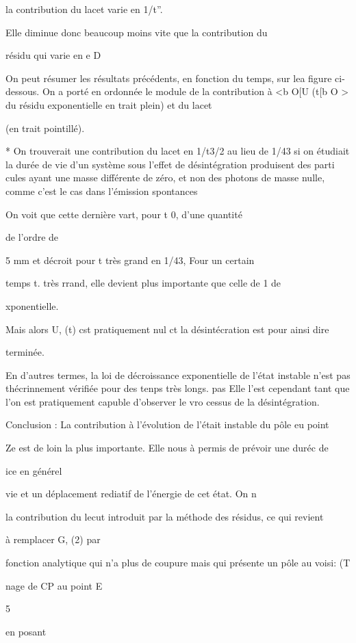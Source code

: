 la contribution du lacet varie en 1/t”.

Elle diminue donc beaucoup moins vite que la contribution du

résidu qui varie en e D

On peut résumer les résultats précédents, en fonction du temps,
sur lea figure ci-dessous. On a porté en ordonnée le module de la contribution
à <b O[U (t[b O > du résidu exponentielle en trait plein) et du lacet

(en trait pointillé).


* On trouverait une contribution du lacet en 1/t3/2 au lieu de 1/43 si on étudiait
la durée de vie d'un système sous l'effet de désintégration produisent des parti
cules ayant une masse différente de zéro, et non des photons de masse nulle, comme
c'est le cas dans l'émission spontances

On voit que cette dernière vart, pour t  0, d'une quantité

de l'ordre de 

5 mm et décroit pour t très grand en 1/43, Four un certain

temps t. très rrand, elle devient plus importante que celle de 1
 de

xponentielle.

Mais alors U, (t) cst pratiquement nul ct la désintécration est pour ainsi dire

terminée.

En d'autres termes, la loi de décroissance exponentielle de
l'état instable n'est pas thécrinnement vérifiée pour des tenps très longs.
pas
Elle l'est cependant tant que l'on est pratiquement capuble d'observer le vro
cessus de la désintégration.

Conclusion : La contribution à l'évolution de l'était instable du pôle eu point

Ze est de loin la plus importante. Elle nous à permis de prévoir une duréc de

ice en générel

vie et un déplacement rediatif de l'énergie de cet état. On n

la contribution du lecut introduit par la méthode des résidus, ce qui revient

à remplacer G, (2) par


fonction analytique qui n'a plus de coupure mais qui présente un pôle au voisi: (T

nage de CP au point E

5

en posant 

